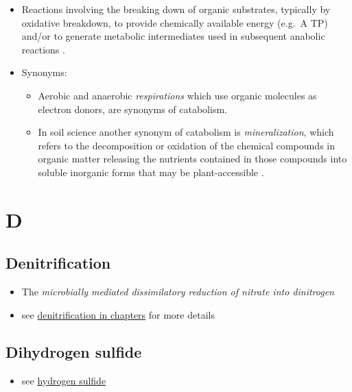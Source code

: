 \documentclass[]{book}
\providecommand{\tightlist}{%
  \setlength{\itemsep}{0pt}\setlength{\parskip}{0pt}}
\theoremstyle{definition}
\theoremstyle{definition}
\theoremstyle{definition}
\theoremstyle{remark}
\begin{document}
\begin{itemize}
\tightlist
\item
  Reactions involving the breaking down of organic substrates, typically
  by oxidative breakdown, to provide chemically available energy (e.g.~A
  TP) and/or to generate metabolic intermediates used in subsequent
  anabolic reactions \citep{De_Bolster1997-ul}.
\item
  Synonyms:

  \begin{itemize}
  \tightlist
  \item
    Aerobic and anaerobic \emph{respirations} which use organic
    molecules as electron donors, are synonyms of catabolism.
  \item
    In soil science another synonym of catabolism is
    \emph{mineralization}, which refers to the decomposition or
    oxidation of the chemical compounds in organic matter releasing the
    nutrients contained in those compounds into soluble inorganic forms
    that may be plant-accessible \citep{Wikipedia_contributors2018-ew}.
  \end{itemize}
\end{itemize}

\section{D}\label{d}

\hypertarget{denitrification}{\subsection{Denitrification}\label{denitrification}}

\begin{itemize}
\tightlist
\item
  The \emph{microbially mediated dissimilatory reduction of nitrate into
  dinitrogen}
\item
  see \protect\hyperlink{denit}{denitrification in chapters} for more
  details
\end{itemize}

\subsection{Dihydrogen sulfide}\label{dihydrogen-sulfide}

\begin{itemize}
\tightlist
\item
  see \protect\hyperlink{H2S}{hydrogen sulfide}
\end{itemize}
\end{document}
